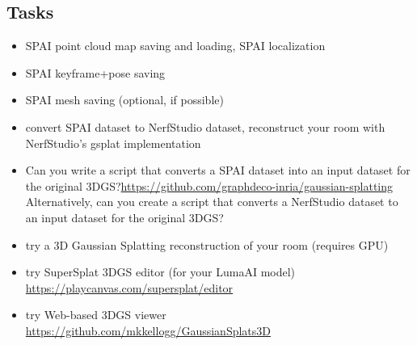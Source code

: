 \documentclass{article}
\begin{document}
\subsection{Tasks}
\begin{itemize}
\item SPAI point cloud map saving and loading, SPAI localization 
\item SPAI keyframe+pose saving 
\item SPAI mesh saving (optional, if possible) 
\item convert SPAI dataset to NerfStudio dataset, reconstruct your room with NerfStudio's gsplat implementation 
\item Can you write a script that converts a SPAI dataset into an input dataset for the original 3DGS?\url{https://github.com/graphdeco-inria/gaussian-splatting} Alternatively, can you create a script that converts a NerfStudio dataset to an input dataset for the original 3DGS?
\item try a 3D Gaussian Splatting reconstruction of your room (requires GPU) 
\item try SuperSplat 3DGS editor (for your LumaAI model) \url{https://playcanvas.com/supersplat/editor} 
\item try Web-based 3DGS viewer \url{https://github.com/mkkellogg/GaussianSplats3D} 
\end{itemize}
\end{document}
